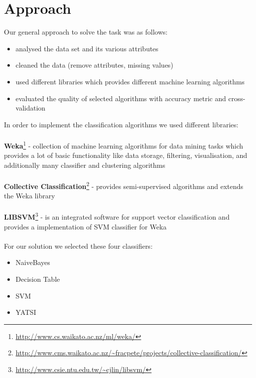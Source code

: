 \section{Approach}
\label{approach}


Our general approach to solve the task was as follows:
\\
\begin{itemize}
	\item[\textbullet] analysed the data set and its various attributes
	\item[\textbullet] cleaned the data (remove attributes, missing values)
	\item[\textbullet] used different libraries which provides different machine learning algorithms
	\item[\textbullet] evaluated the quality of selected algorithms with accuracy metric and cross-validation
\end{itemize}
In order to implement the classification algorithms we used different libraries: \\
\\
\textbf{Weka}\footnote{\url{http://www.cs.waikato.ac.nz/ml/weka/}} -
collection of machine learning algorithms for data mining tasks which provides a lot of basic functionality like data storage, filtering, visualisation, and additionally many classifier and clustering algorithms \\
\\
\textbf{Collective Classification}\footnote{\url{http://www.cms.waikato.ac.nz/~fracpete/projects/collective-classification/}} - 
provides semi-supervised algorithms and extends the Weka library \\
\\
\textbf{LIBSVM}\footnote{\url{http://www.csie.ntu.edu.tw/~cjlin/libsvm/}} - 
is an integrated software for support vector classification and provides a implementation of SVM classifier for Weka \\
\\
For our solution we selected these four classifiers:
\begin{itemize}
	\item[\textbullet] NaiveBayes
	\item[\textbullet] Decision Table
	\item[\textbullet] SVM
	\item[\textbullet] YATSI
\end{itemize}
